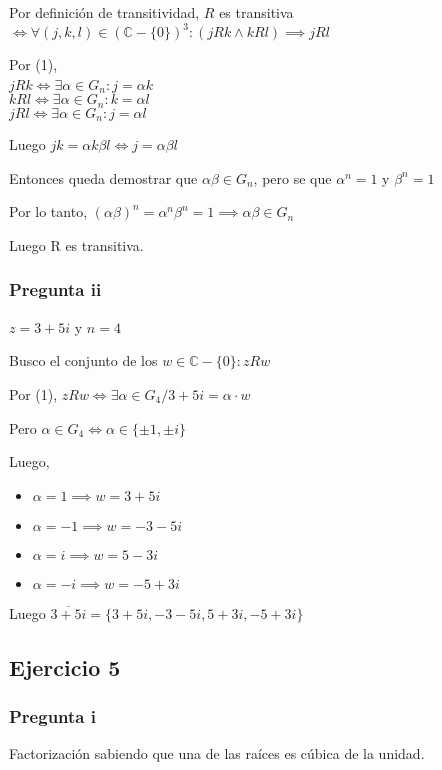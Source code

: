 Por definición de transitividad, $R$ es transitiva $ \iff \forall (j,k,l) \in (\mathbb{C} - \{ 0 \})^3: (jRk \wedge kRl) \implies jRl $

Por (1), \\
$ jRk \iff \exists \alpha \in G_n: j = \alpha k $ \\
$ kRl \iff \exists \alpha \in G_n: k = \alpha l $ \\
$ jRl \iff \exists \alpha \in G_n: j = \alpha l $

Luego $ jk = \alpha k \beta l \iff j = \alpha \beta l $

Entonces queda demostrar que $ \alpha \beta \in G_n $, pero se que $ \alpha^n = 1 $ y $ \beta^n = 1 $

Por lo tanto, $ (\alpha \beta)^n = \alpha^n \beta^n = 1 \implies \alpha \beta \in G_n $

Luego R es transitiva.

\subsubsection{Pregunta ii}

$ z = 3+5i $ y $ n = 4 $

Busco el conjunto de los $ w \in \mathbb{C} - \{ 0 \}: zRw $

Por (1), $ zRw \iff \exists \alpha \in G_4 / 3+5i = \alpha \cdot w $

Pero $ \alpha \in G_4 \iff \alpha \in \{ \pm 1, \pm i \} $

Luego,
\begin{itemize}
    \item $ \alpha = 1 \implies w = 3+5i $
    \item $ \alpha = -1 \implies w = -3-5i $
    \item $ \alpha = i \implies w = 5-3i $
    \item $ \alpha = -i \implies w = -5+3i $
\end{itemize}
Luego $ \overline{3+5i} = \{ 3+5i, -3-5i, 5+3i, -5+3i \} $

\subsection{Ejercicio 5}

\subsubsection{Pregunta i}

Factorización sabiendo que una de las raíces es cúbica de la unidad.

